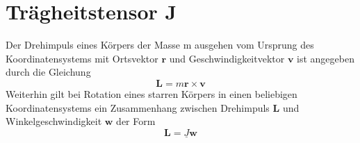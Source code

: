 

\section{Trägheitstensor $\mathbf{J}$}

Der Drehimpuls eines Körpers der Masse m ausgehen vom Ursprung des Koordinatensystems mit Ortsvektor $\mathbf{r}$ und Geschwindigkeitvektor
$\mathbf{v}$ ist angegeben durch die Gleichung
\begin{equation}
    \mathbf{L}=m\mathbf{r}\times\mathbf{v}
\end{equation}
Weiterhin gilt bei Rotation eines starren Körpers in einen beliebigen Koordinatensystems ein Zusammenhang zwischen Drehimpuls $\mathbf{L}$
und Winkelgeschwindigkeit $\mathbf{w}$ der Form
\begin{equation}
    \mathbf{L}=\underline{J}\mathbf{w}
\end{equation}